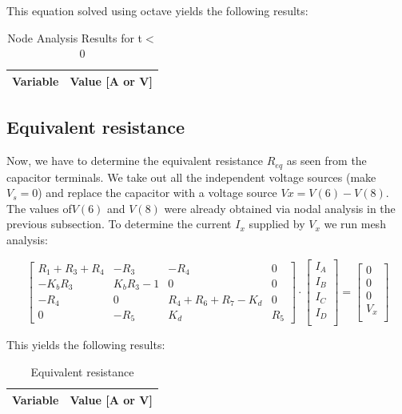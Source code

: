 This equation solved using octave yields the following results:

\begin{table}[H]
    \centering
    \begin{tabular}{|l|r|}
      \hline    
      {\bf Variable} & {\bf Value [A or V]} \\ \hline
      
    \end{tabular}
    \caption{Node Analysis Results for t$<$0}
    \label{tab:nodeanalysis}
  \end{table}
  
  
\subsection{Equivalent resistance}
Now,  we have to determine the equivalent resistance $R_{eq}$ as seen from the capacitor terminals. We take out all the independent voltage sources (make $V_s=0$) and replace the capacitor with a voltage source $Vx= V(6)-V(8)$. The values of$ V(6)$ and $V(8)$ were already obtained via nodal analysis in the previous subsection. To determine the current $I_x$ supplied by $V_x$ we run mesh analysis:


\begin{equation}\label{eq:matrixeq2}
\begin{bmatrix}
 R_1+R_3+R_4 & -R_3 & -R_4 & 0\\
    -K_bR_3 &  K_bR_3-1 & 0 & 0\\ 
    -R_4 & 0 & R_4+R_6+R_7-K_d & 0\\
    0 & -R_5 & K_d & R_5 
\end{bmatrix}
\cdot
\begin{bmatrix}
I_A\\
I_B \\
I_C \\
I_D \\

    \end{bmatrix}
=
    \begin{bmatrix}
0 \\
0 \\
0 \\
V_x \\

    \end{bmatrix}
  \end{equation}

This yields the following results:

\begin{table}[H]
    \centering
    \begin{tabular}{|l|r|}
      \hline    
      {\bf Variable} & {\bf Value [A or V]} \\ \hline
      
    \end{tabular}
    \caption{Equivalent resistance}
    \label{tab:equivalentresistance}
  \end{table}
  
